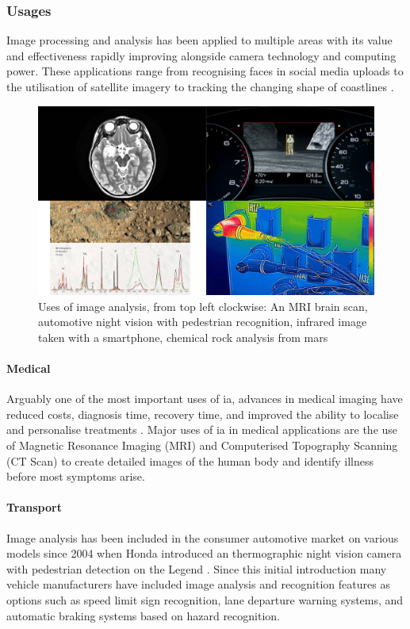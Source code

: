 	\subsubsection{Usages}
	Image processing and analysis has been applied to multiple areas with its value and 
	effectiveness rapidly improving alongside camera technology and computing power. These 
	applications range from recognising faces in social media uploads \citep{zuckerberg2011tagging} 
	to the utilisation of satellite imagery to tracking the changing shape of coastlines 
	\citep{costalimagery}.
	\begin{figure}[h!]
		\centering
		\includegraphics[width=15cm]{../images/4panel.png}
		\caption{Uses of image analysis, from top left clockwise: An MRI brain scan, automotive 
		night vision with pedestrian recognition, infrared image taken with a smartphone, chemical 
		rock analysis from 
			mars}
		\label{fig:curiosity}
	\end{figure}
	\paragraph{Medical}
	Arguably one of the most important uses of \gls{ia}, advances in medical imaging have reduced costs, diagnosis time, recovery time, and improved the ability to localise and personalise treatments \citep{esfmedical}. Major uses of \gls{ia} in medical applications are the use of Magnetic Resonance Imaging (MRI) and Computerised Topography Scanning (CT Scan) to create detailed images of the human body and identify illness before most symptoms arise.
	\paragraph{Transport}
	Image analysis has been included in the consumer automotive market on various models since 2004 when Honda introduced an thermographic night vision camera with pedestrian detection on the Legend  \citep{hondanightvision}. Since this initial introduction many vehicle manufacturers have included image analysis and recognition features as options such as speed limit sign recognition, lane departure warning systems, and automatic braking systems based on hazard recognition.
